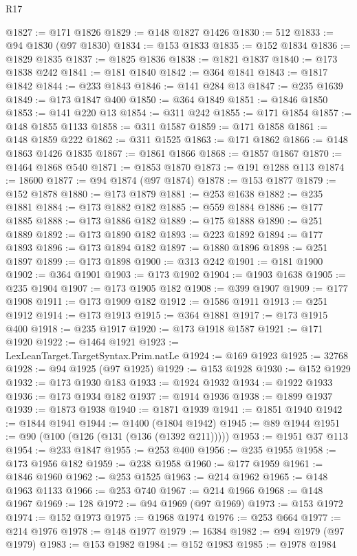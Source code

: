 \begin{lexlean}{R17}
\begin{coremodule}
@1827 := @171 @1826
@1829 := @148 @1827 @1426
@1830 := 512
@1833 := @94 @1830 (@97 @1830)
@1834 := @153 @1833
@1835 := @152 @1834
@1836 := @1829 @1835
@1837 := @1825 @1836
@1838 := @1821 @1837
@1840 := @173 @1838 @242
@1841 := @181 @1840
@1842 := @364 @1841
@1843 := @1817 @1842
@1844 := @233 @1843
@1846 := @141 @284 @13
@1847 := @235 @1639
@1849 := @173 @1847 @400
@1850 := @364 @1849
@1851 := @1846 @1850
@1853 := @141 @220 @13
@1854 := @311 @242
@1855 := @171 @1854
@1857 := @148 @1855 @1133
@1858 := @311 @1587
@1859 := @171 @1858
@1861 := @148 @1859 @222
@1862 := @311 @1525
@1863 := @171 @1862
@1866 := @148 @1863 @1426 @1835
@1867 := @1861 @1866
@1868 := @1857 @1867
@1870 := @1464 @1868 @540
@1871 := @1853 @1870
@1873 := @191 @1288 @113
@1874 := 18600
@1877 := @94 @1874 (@97 @1874)
@1878 := @153 @1877
@1879 := @152 @1878
@1880 := @173 @1879
@1881 := @253 @1638
@1882 := @235 @1881
@1884 := @173 @1882 @182
@1885 := @559 @1884
@1886 := @177 @1885
@1888 := @173 @1886 @182
@1889 := @175 @1888
@1890 := @251 @1889
@1892 := @173 @1890 @182
@1893 := @223 @1892
@1894 := @177 @1893
@1896 := @173 @1894 @182
@1897 := @1880 @1896
@1898 := @251 @1897
@1899 := @173 @1898
@1900 := @313 @242
@1901 := @181 @1900
@1902 := @364 @1901
@1903 := @173 @1902
@1904 := @1903 @1638
@1905 := @235 @1904
@1907 := @173 @1905 @182
@1908 := @399 @1907
@1909 := @177 @1908
@1911 := @173 @1909 @182
@1912 := @1586 @1911
@1913 := @251 @1912
@1914 := @173 @1913
@1915 := @364 @1881
@1917 := @173 @1915 @400
@1918 := @235 @1917
@1920 := @173 @1918 @1587
@1921 := @171 @1920
@1922 := @1464 @1921
@1923 := LexLeanTarget.TargetSyntax.Prim.natLe
@1924 := @169 @1923
@1925 := 32768
@1928 := @94 @1925 (@97 @1925)
@1929 := @153 @1928
@1930 := @152 @1929
@1932 := @173 @1930 @183
@1933 := @1924 @1932
@1934 := @1922 @1933
@1936 := @173 @1934 @182
@1937 := @1914 @1936
@1938 := @1899 @1937
@1939 := @1873 @1938
@1940 := @1871 @1939
@1941 := @1851 @1940
@1942 := @1844 @1941
@1944 := @1400 (@1804 @1942)
@1945 := @89 @1944
@1951 := @90 (@100 (@126 (@131 (@136 (@1392 @211)))))
@1953 := @1951 @37 @113
@1954 := @233 @1847
@1955 := @253 @400
@1956 := @235 @1955
@1958 := @173 @1956 @182
@1959 := @238 @1958
@1960 := @177 @1959
@1961 := @1846 @1960
@1962 := @253 @1525
@1963 := @214 @1962
@1965 := @148 @1963 @1133
@1966 := @253 @740
@1967 := @214 @1966
@1968 := @148 @1967
@1969 := 128
@1972 := @94 @1969 (@97 @1969)
@1973 := @153 @1972
@1974 := @152 @1973
@1975 := @1968 @1974
@1976 := @253 @664
@1977 := @214 @1976
@1978 := @148 @1977
@1979 := 16384
@1982 := @94 @1979 (@97 @1979)
@1983 := @153 @1982
@1984 := @152 @1983
@1985 := @1978 @1984

\end{coremodule}
\end{lexlean}
